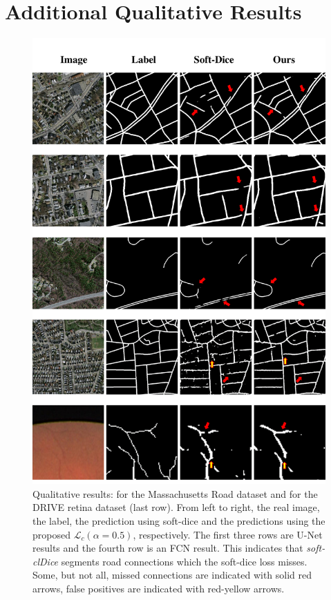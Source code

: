 \section{Additional Qualitative Results} 
\begin{figure}[]
\label{supp_road}
\centering

\includegraphics[width=0.78\linewidth]{figs/suppl/Appendix_clDice_qualitative_results.pdf}

\caption{\footnotesize Qualitative results:  for the Massachusetts Road dataset and  for the DRIVE retina dataset (last row). From left to right, the real image, the label, the prediction using soft-dice and the predictions using the proposed $\mathcal{L}_c (\alpha=0.5)$, respectively. The first three rows are U-Net results and the fourth row is an FCN result. This indicates that \textit{soft-clDice} segments road connections which the soft-dice loss misses. Some,  but  not  all,  missed  connections  are  indicated with solid red arrows, false positives are indicated with red-yellow arrows.}
\end{figure}


